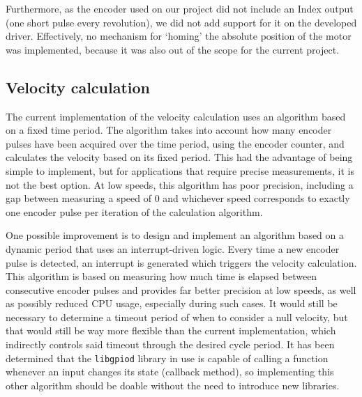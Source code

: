 Furthermore, as the encoder used on our project did not include an Index output (one short pulse every revolution), we did not add support for it on the developed driver.
Effectively, no mechanism for `homing' the absolute position of the motor was implemented, because it was also out of the scope for the current project.

\subsection{Velocity calculation}
The current implementation of the velocity calculation uses an algorithm based on a fixed time period.
The algorithm takes into account how many encoder pulses have been acquired over the time period, using the encoder counter, and calculates the velocity based on its fixed period.
This had the advantage of being simple to implement, but for applications that require precise measurements, it is not the best option.
At low speeds, this algorithm has poor precision, including a gap between measuring a speed of 0 and whichever speed corresponds to exactly one encoder pulse per iteration of the calculation algorithm.

One possible improvement is to design and implement an algorithm based on a dynamic period that uses an interrupt-driven logic.
Every time a new encoder pulse is detected, an interrupt is generated which triggers the velocity calculation.
This algorithm is based on measuring how much time is elapsed between consecutive encoder pulses and provides far better precision at low speeds, as well as possibly reduced CPU usage, especially during such cases.
It would still be necessary to determine a timeout period of when to consider a null velocity, but that would still be way more flexible than the current implementation, which indirectly controls said timeout through the desired cycle period.
It has been determined that the \verb|libgpiod| library in use is capable of calling a function whenever an input changes its state (callback method), so implementing this other algorithm should be doable without the need to introduce new libraries.

